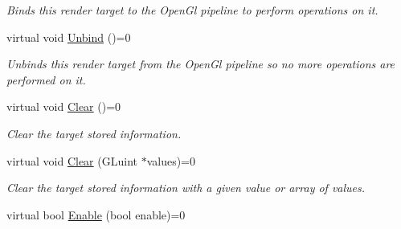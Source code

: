 \begin{DoxyCompactItemize}
\begin{DoxyCompactList}\small\item\em Binds this render target to the Open\+Gl pipeline to perform operations on it. \end{DoxyCompactList}\item 
\mbox{\label{class_geometry_engine_1_1_geometry_buffer_1_1_g_render_target_ac5ccb0cf3cc88d157a3688ee188f4214}} 
virtual void \mbox{\hyperlink{class_geometry_engine_1_1_geometry_buffer_1_1_g_render_target_ac5ccb0cf3cc88d157a3688ee188f4214}{Unbind}} ()=0
\begin{DoxyCompactList}\small\item\em Unbinds this render target from the Open\+Gl pipeline so no more operations are performed on it. \end{DoxyCompactList}\item 
\mbox{\label{class_geometry_engine_1_1_geometry_buffer_1_1_g_render_target_a4d17d0a665d440caa9293c1908d6b1ea}} 
virtual void \mbox{\hyperlink{class_geometry_engine_1_1_geometry_buffer_1_1_g_render_target_a4d17d0a665d440caa9293c1908d6b1ea}{Clear}} ()=0
\begin{DoxyCompactList}\small\item\em Clear the target stored information. \end{DoxyCompactList}\item 
\mbox{\label{class_geometry_engine_1_1_geometry_buffer_1_1_g_render_target_ac33eb031fd6f739915b47cf9becd8d34}} 
virtual void \mbox{\hyperlink{class_geometry_engine_1_1_geometry_buffer_1_1_g_render_target_ac33eb031fd6f739915b47cf9becd8d34}{Clear}} (G\+Luint $\ast$values)=0
\begin{DoxyCompactList}\small\item\em Clear the target stored information with a given value or array of values. \end{DoxyCompactList}\item 
virtual bool \mbox{\hyperlink{class_geometry_engine_1_1_geometry_buffer_1_1_g_render_target_a1b8be750dfd13582d0730bf9e4c4e1d2}{Enable}} (bool enable)=0
\item 
\mbox{\label{class_geometry_engine_1_1_geometry_buffer_1_1_g_render_target_a6134efcdfa6fa9775c293a0802706cfc}} 

\end{DoxyCompactItemize}
